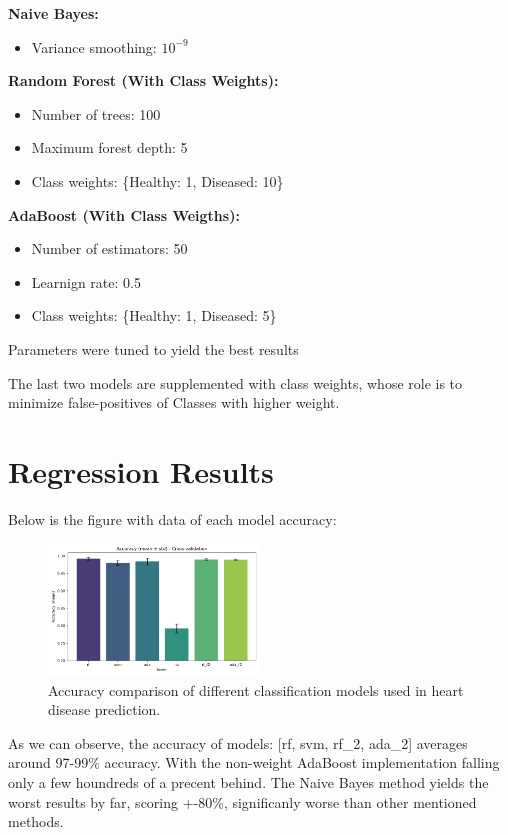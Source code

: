 \documentclass[conference]{IEEEtran}
\begin{document}
\textbf{Naive Bayes:}
\begin{itemize}
    \item Variance smoothing: $10^{-9}$
\end{itemize}

\textbf{Random Forest (With Class Weights):}
\begin{itemize}
    \item Number of trees: 100
    \item Maximum forest depth: 5
    \item Class weights: \{Healthy: 1, Diseased: 10\}
\end{itemize}

\textbf{AdaBoost (With Class Weigths):}
\begin{itemize}
    \item Number of estimators: 50
    \item Learnign rate: 0.5
    \item Class weights: \{Healthy: 1, Diseased: 5\}
\end{itemize}

Parameters were tuned to yield the best results %

The last two models are supplemented with class weights, whose role is to minimize false-positives of Classes with higher weight.

\section{Regression Results}

Below is the figure with data of each model accuracy:
\begin{figure}[H]%
    \centering
    \includegraphics[width=0.5\textwidth]{../src/plots/accuracy_cv_plot.png}
    \caption{Accuracy comparison of different classification models used in heart disease prediction.}
    \label{fig:accuracy}
\end{figure}

As we can observe, the accuracy of models: [rf, svm, rf\_2, ada\_2] averages around 97-99\% accuracy.
With the non-weight AdaBoost implementation falling only a few houndreds of a precent behind.
The Naive Bayes method yields the worst results by far, scoring +-80\%, significanly worse than other
mentioned methods.
\end{document}
